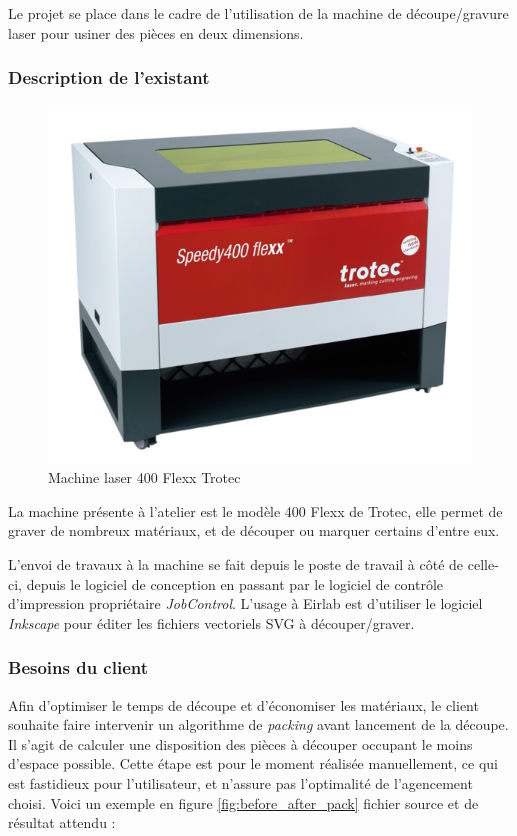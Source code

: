Le projet se place dans le cadre de l'utilisation de la machine de découpe/gravure laser pour usiner des pièces en deux dimensions.

\subsubsection*{Description de l'existant}

\begin{figure}
    \includegraphics[scale=0.3]{img/lasermachine.png}
    \caption{Machine laser 400 Flexx Trotec}
    \label{fig:lasermachine}
\end{figure}

La machine présente à l'atelier est le modèle 400 Flexx de Trotec, elle permet de graver de nombreux matériaux, et de découper ou marquer certains d'entre eux. 

L'envoi de travaux à la machine se fait depuis le poste de travail à côté de celle-ci, depuis le logiciel de conception en passant par le logiciel de contrôle d'impression propriétaire \textit{JobControl}. L'usage à Eirlab est d'utiliser le logiciel \textit{Inkscape} pour éditer les fichiers vectoriels SVG à découper/graver.


\subsubsection*{Besoins du client}
Afin d'optimiser le temps de découpe et d'économiser les matériaux, le client souhaite faire intervenir un algorithme de \textit{packing} avant lancement de la découpe. Il s'agit de calculer une disposition des pièces à découper occupant le moins d'espace possible. Cette étape est pour le moment réalisée manuellement, ce qui est fastidieux pour l'utilisateur, et n'assure pas l'optimalité de l'agencement choisi. Voici un exemple en figure \ref{fig:before_after_pack} fichier source et de résultat attendu :

